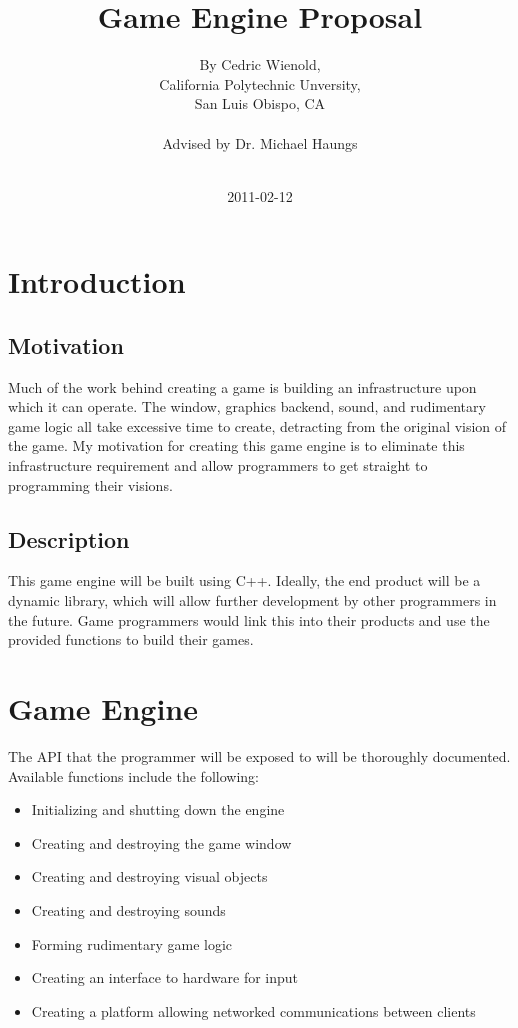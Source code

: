 \documentclass[12pt]{article}
\title{Game Engine Proposal}
\author{By Cedric Wienold,\\
California Polytechnic Unversity,\\
San Luis Obispo, CA\\\\
Advised by Dr. Michael Haungs\\\\}
\date{2011-02-12}
\begin{document}
  \maketitle

  \thispagestyle{empty}

  \newpage

  \section{Introduction}
    \subsection{Motivation}
      Much of the work behind creating a game is building an infrastructure upon which it can operate. The window, graphics backend, sound, and rudimentary game logic all take excessive time to create, detracting from the original vision of the game. My motivation for creating this game engine is to eliminate this infrastructure requirement and allow programmers to get straight to programming their visions.
    \subsection{Description}
      This game engine will be built using C++. Ideally, the end product will be a dynamic library, which will allow further development by other programmers in the future. Game programmers would link this into their products and use the provided functions to build their games.
  \section{Game Engine}
    The API that the programmer will be exposed to will be thoroughly documented. Available functions include the following:

    \begin{itemize}
      \item Initializing and shutting down the engine
      \item Creating and destroying the game window
      \item Creating and destroying visual objects
      \item Creating and destroying sounds
      \item Forming rudimentary game logic
      \item Creating an interface to hardware for input
      \item Creating a platform allowing networked communications between clients
    \end{itemize}
\end{document}
